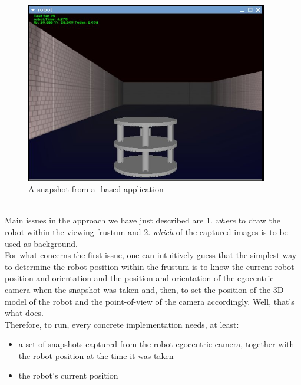 \begin{figure}[!h]
  \begin{center}
    \includegraphics[width=300pt]{img/rear_snapshot_large.jpg}
    \caption{A snapshot from a \framework{}-based application}
    \label{fig:snap}
  \end{center}
\end{figure}
\\
Main issues in the approach we have just described are 1. 
\textit{where} to draw the robot within the viewing frustum 
and 2. \textit{which} of the captured images is to be used 
as background.
\\
For what concerns the first issue, one can intuitively guess 
that the simplest way to determine the robot position 
within the frustum is to know the current robot position 
and orientation and the position and orientation of the egocentric 
camera when the snapshot was taken and, then, to set the 
position of the 3D model of the robot and the point-of-view 
of the camera accordingly.
Well, that's what \framework{} does.
\\
Therefore, to run, every \framework{} concrete implementation 
needs, at least:

\begin{itemize}
  \item a set of snapshots captured from the robot egocentric camera, 
    together with the robot position at the time it was taken
  \item the robot's current position
\end{itemize}

